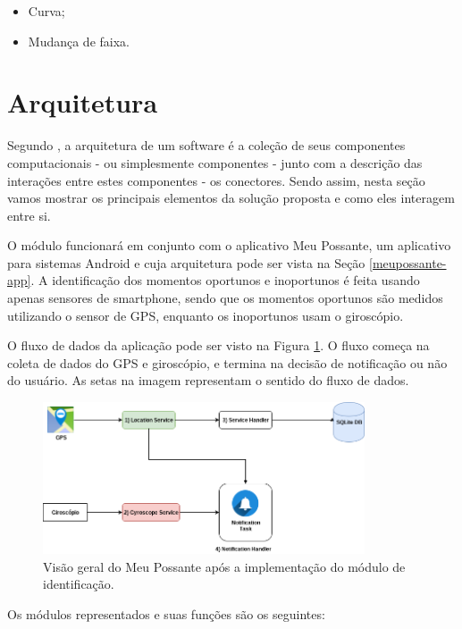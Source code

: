 \begin{itemize}
  \item Curva;
  \item Mudança de faixa.
\end{itemize}

\section{Arquitetura}
\label{sec-arquitetura-solucao}
Segundo , a arquitetura de um software é a coleção de seus componentes computacionais - ou simplesmente
componentes - junto com a descrição das interações entre estes componentes - os conectores. Sendo assim, nesta seção
vamos mostrar os principais elementos da solução proposta e como eles interagem entre si.

O módulo funcionará em conjunto com o aplicativo Meu Possante, um aplicativo para sistemas Android e cuja arquitetura pode ser vista
na Seção \ref{meupossante-app}. A identificação dos momentos oportunos e inoportunos é feita usando apenas sensores de smartphone,
sendo que os momentos oportunos são medidos utilizando o sensor de GPS, enquanto os inoportunos usam o giroscópio.

O fluxo de dados da aplicação pode ser visto na Figura \ref{arquitetura-meu-possante-com-modulo}. O fluxo começa
na coleta de dados do GPS e giroscópio, e termina na decisão de notificação ou não do usuário. As setas na
imagem representam o sentido do fluxo de dados.

\begin{figure}[h]
\centering
\includegraphics[width=0.85\textwidth]{images/arquitetura-meu-possante-com-modulo.png}
\caption{Visão geral do Meu Possante após a implementação do módulo de identificação.}
\label{arquitetura-meu-possante-com-modulo}
\end{figure}

Os módulos representados e suas funções são os seguintes:

